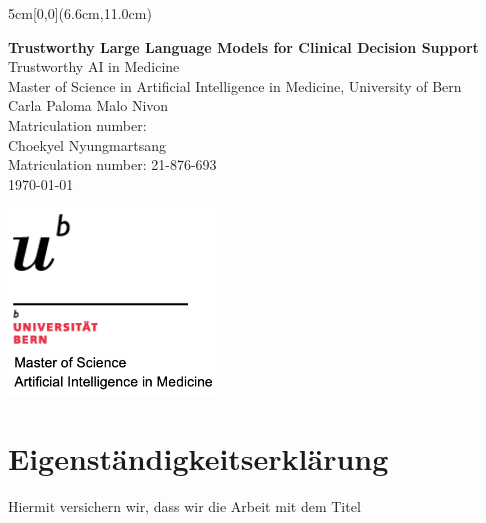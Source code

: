 \documentclass[12pt,a4paper]{scrreprt}
\begin{document}
\begin{titlepage}
	\begin{textblock*}{5cm}[0,0](6.6cm,11.0cm)
	\end{textblock*}
	\begin{center}
		\vspace*{2cm}
		\Huge{\textbf{Trustworthy Large Language Models for Clinical Decision Support}}\\
    \vspace{3em}
		\Large{Trustworthy AI in Medicine}\\
    \vspace{0.5em}
    \normalsize Master of Science in Artificial Intelligence in Medicine,
University of Bern\\
		\vspace{10em}
        \Large{Carla Paloma Malo Nivon}\\
        \vspace{0.5em}
        \normalsize Matriculation number: \\
        \vspace{4em}
        \Large{Choekyel Nyungmartsang}\\
        \vspace{0.5em}
        \normalsize Matriculation number: 21-876-693\\
		\vfill
        \Large{\today}\\

    
	\end{center}
 
\newpage

\thispagestyle{empty}
\begin{flushright}
    \includegraphics[width=5.5cm]{university_logo.png} %
\end{flushright}
\vspace{2cm}
\section*{Eigenständigkeitserklärung}
{\small
Hiermit versichern wir, dass wir die Arbeit mit dem Titel

}
\end{titlepage}
\end{document}

